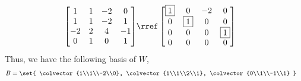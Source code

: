 %
\begin{align*}
\begin{bmatrix} 
1 & 1 & -2 & 0\\ 
1 & 1 & -2 & 1\\ 
-2 & 2 & 4 & -1\\ 
0 & 1 & 0 & 1 
\end{bmatrix} 
&\rref 
\begin{bmatrix} 
\framebox{1} & 0 & -2 & 0\\
0 & \framebox{1} & 0 & 0\\ 
0 & 0 & 0 & \framebox{1}\\ 
0 & 0 & 0 &0 
\end{bmatrix}
\end{align*}
%
Thus, we have the following basis of $W$,
%
\begin{align*}
B &= \set{
\colvector{1\\1\\-2\\0}, 
\colvector{1\\1\\2\\1},
\colvector{0\\1\\-1\\1} 
}
\end{align*}

